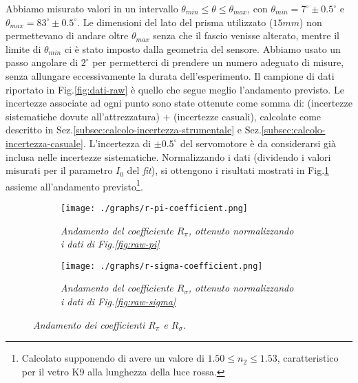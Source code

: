   Abbiamo misurato valori in un intervallo ${\theta_{min} \leq \theta \leq \theta_{max}}$,
  con ${\theta_{min} = 7^\circ \pm 0.5^\circ}$ e $\theta_{max} = 83^\circ \pm 0.5^\circ$.
  Le dimensioni del lato del prisma utilizzato ($15mm$) non permettevano
  di andare oltre $\theta_{max}$ senza che il fascio venisse alterato, mentre il
  limite di $\theta_{min}$ ci è stato imposto dalla geometria del sensore.
  Abbiamo usato un passo angolare di $2^\circ$ per permetterci di prendere un
  numero adeguato di misure, senza allungare eccessivamente la durata dell'esperimento.
  Il campione di dati riportato in Fig.\ref{fig:dati-raw} è quello che segue meglio
  l'andamento previsto.
  Le incertezze associate ad ogni punto sono state ottenute come somma di:
  (incertezze sistematiche dovute all'attrezzatura) $+$ (incertezze casuali), calcolate come
  descritto in Sez.\ref{subsec:calcolo-incertezza-strumentale} e Sez.\ref{subsec:calcolo-incertezza-casuale}. L'incertezza di $\pm 0.5^\circ$ del servomotore
  è da considerarsi già inclusa nelle incertezze sistematiche.
  Normalizzando i dati (dividendo i valori misurati per il parametro $I_0$ del \emph{fit}), si ottengono i risultati mostrati in Fig.\ref{fig:normalised-coefficients}
  assieme all'andamento previsto\footnote{Calcolato supponendo di avere un valore di $1.50 \leq n_2 \leq 1.53$,
  caratteristico per il vetro K9 alla lunghezza della luce rossa.}. %
  \begin{figure}[H]
    \centering
    \begin{subfigure}[t]{.47\textwidth}
      \texttt{[image: ./graphs/r-pi-coefficient.png]}
      \caption{
        \emph{
          Andamento del coefficiente $R_\pi$, ottenuto normalizzando i dati
          di Fig.\ref{fig:raw-pi}
        }
      }
      \label{fig:normalised-coefficients}
    \end{subfigure}
    \hspace{5mm}
    \begin{subfigure}[t]{.47\textwidth}
      \texttt{[image: ./graphs/r-sigma-coefficient.png]}
      \caption{
        \emph{
          Andamento del coefficiente $R_\sigma$, ottenuto normalizzando i dati
          di Fig.\ref{fig:raw-sigma}
        }
      }
      \label{fig:coefficienti-ampiezza}
    \end{subfigure}
    \caption{\emph{Andamento dei coefficienti $R_\pi$ e $R_\sigma$.}}
  \end{figure}
%
